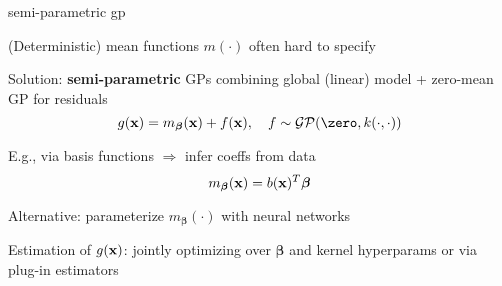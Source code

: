 \documentclass[11pt,compress,t,notes=noshow, xcolor=table]{beamer}
\begin{document}
\begin{framei}[sep=L]{semi-parametric gp}
\item (Deterministic) mean functions $m(\cdot)$ often hard to specify
\item Solution: \textbf{semi-parametric} GPs combining global (linear) model + zero-mean GP for residuals
$$g(\xv) = m_{\bm{\beta}}(\xv) + \fx, \quad f  \sim \GPzk$$
\item E.g., via basis functions $\Rightarrow$ infer coeffs from data
$$m_{\bm{\beta}}(\mathbf{x}) = b(\mathbf{x})^T\bm{\beta}$$
\item Alternative: parameterize $m_{\bm{\beta}}(\cdot)$ with neural networks
\item Estimation of $g(\mathbf{x})$: jointly optimizing over $\bm{\beta}$ and kernel hyperparams or via plug-in estimators 
\end{framei}




\endlecture
\end{document}
